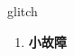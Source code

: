 
\begin{frame}
{\huge glitch}
\begin{center}
\begin{enumerate}\Large
  \item \textbf{小故障}
\end{enumerate}
\end{center}
\end{frame}
